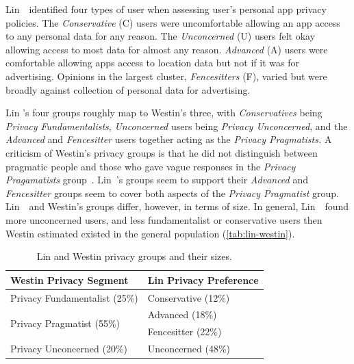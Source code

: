 \documentclass[thesis.tex]{subfiles}
\begin{document}
Lin~\etal~identified four types of user when assessing user's personal
app privacy policies.  The \emph{Conservative} (C) users were
uncomfortable allowing an app access to any personal data for any
reason.  The \emph{Unconcerned} (U) users felt okay allowing access to
most data for almost any reason.  \emph{Advanced} (A) users were
comfortable allowing apps access to location data but not if it was
for advertising.  Opinions in the largest cluster, \emph{Fencesitters}
(F), varied but were broadly against collection of personal data for
advertising.

Lin \etal's four groups roughly map to Westin's three, with
\emph{Conservatives} being \emph{Privacy Fundamentalists},
\emph{Unconcerned} users being \emph{Privacy Unconcerned}, and the
\emph{Advanced} and \emph{Fencesitter} users together acting as the
\emph{Privacy Pragmatists.}  A criticism of Westin's privacy groups is
that he did not distinguish between pragmatic people and those who
gave vague responses in the \emph{Privacy Pragamatists}
group~\cite{urban_privacy_2014}. Lin~\etal's groups seem to support
their \emph{Advanced} and \emph{Fencesitter} groups seem to cover both
aspects of the \emph{Privacy Pragmatist} group.  Lin~\etal~and
Westin's groups differ, however, in terms of size.  In general,
Lin~\etal~found more unconcerned users, and less fundamentalist or
conservative users then Westin estimated existed in the general
population (\autoref{tab:lin-westin}).

\begin{table}
  \centering\sffamily\footnotesize
  \begin{tabular}{ll}
    \toprule
    \textbf{Westin Privacy Segment}            & \textbf{Lin \etal{} Privacy Preference} \\
    \midrule
    Privacy Fundamentalist (25\%)              & Conservative (12\%)                     \\
    \midrule
    \multirow{2}{*}{Privacy Pragmatist (55\%)} & Advanced (18\%)                         \\
                                               & Fencesitter (22\%)                      \\
    \midrule
    Privacy Unconcerned (20\%)                 & Unconcerned (48\%)                      \\
    \bottomrule
  \end{tabular}
  \caption{Lin and Westin privacy groups and their sizes.}
  \label{tab:lin-westin}
\end{table}
\end{document}
